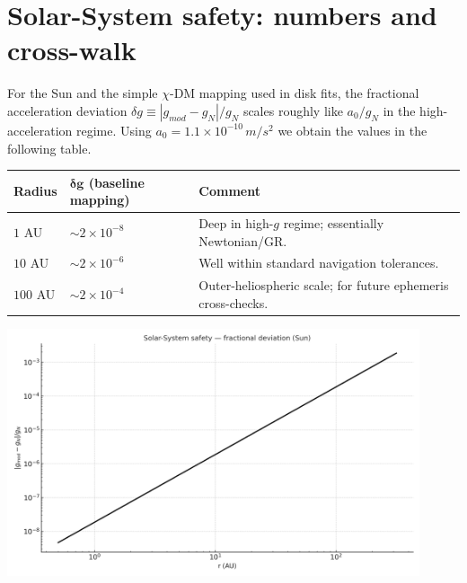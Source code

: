 \documentclass[
]{article}
\begin{document}
\section{Solar-System safety: numbers and
cross-walk}\label{solar-system-safety-numbers-and-cross-walk}

For the Sun and the simple \(\chi\)-DM mapping used in disk fits, the
fractional acceleration deviation
\(\delta g \equiv |g_{mod} - g_{N}|/g_{N}\) scales roughly like
\(a_{0}/g_{N}\) in the high-acceleration regime. Using
\(a_{0} = 1.1 \times 10^{- 10}\, m/s^{2}\) we obtain the values in the
following table.

\begin{longtable}[]{@{}
  >{\raggedright\arraybackslash}p{}
  >{\centering\arraybackslash}p{}
  >{\centering\arraybackslash}p{}@{}}
\toprule\noalign{}
\begin{minipage}[b]{\linewidth}\raggedright
\textbf{Radius}
\end{minipage} & \begin{minipage}[b]{\linewidth}\centering
\(\mathbf{\delta g}\) (baseline mapping)
\end{minipage} & \begin{minipage}[b]{\linewidth}\centering
\textbf{Comment}
\end{minipage} \\
\midrule\noalign{}
\endhead
\bottomrule\noalign{}
\endlastfoot
\(1\) AU & \(\sim 2 \times 10^{- 8}\) & Deep in high-\(g\) regime;
essentially Newtonian/GR. \\
\(10\) AU & \(\sim 2 \times 10^{- 6}\) & Well within standard navigation
tolerances. \\
\(100\) AU & \(\sim 2 \times 10^{- 4}\) & Outer-heliospheric scale; for
future ephemeris cross-checks. \\
\end{longtable}

\includegraphics[width=4.78333in,height=2.87in,alt={A graph with a line AI-generated content may be incorrect.}]{letter_media/media/image3.png}
\end{document}
